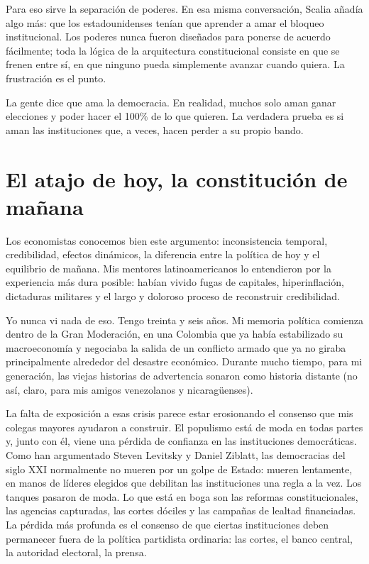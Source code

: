\documentclass[11pt,letterpaper]{article}
\begin{document}
Para eso sirve la separación de poderes. En esa misma conversación, Scalia añadía algo más: que los estadounidenses tenían que aprender a amar el bloqueo institucional. Los poderes nunca fueron diseñados para ponerse de acuerdo fácilmente; toda la lógica de la arquitectura constitucional consiste en que se frenen entre sí, en que ninguno pueda simplemente avanzar cuando quiera. La frustración es el punto.

La gente dice que ama la democracia. En realidad, muchos solo aman ganar elecciones y poder hacer el 100\% de lo que quieren. La verdadera prueba es si aman las instituciones que, a veces, hacen perder a su propio bando.

\section{El atajo de hoy, la constitución de mañana}

Los economistas conocemos bien este argumento: inconsistencia temporal, credibilidad, efectos dinámicos, la diferencia entre la política de hoy y el equilibrio de mañana. Mis mentores latinoamericanos lo entendieron por la experiencia más dura posible: habían vivido fugas de capitales, hiperinflación, dictaduras militares y el largo y doloroso proceso de reconstruir credibilidad.

Yo nunca vi nada de eso. Tengo treinta y seis años. Mi memoria política comienza dentro de la Gran Moderación, en una Colombia que ya había estabilizado su macroeconomía y negociaba la salida de un conflicto armado que ya no giraba principalmente alrededor del desastre económico. Durante mucho tiempo, para mi generación, las viejas historias de advertencia sonaron como historia distante (no así, claro, para mis amigos venezolanos y nicaragüenses).

La falta de exposición a esas crisis parece estar erosionando el consenso que mis colegas mayores ayudaron a construir. El populismo está de moda en todas partes y, junto con él, viene una pérdida de confianza en las instituciones democráticas. Como han argumentado Steven Levitsky y Daniel Ziblatt, las democracias del siglo XXI normalmente no mueren por un golpe de Estado: mueren lentamente, en manos de líderes elegidos que debilitan las instituciones una regla a la vez. Los tanques pasaron de moda. Lo que está en boga son las reformas constitucionales, las agencias capturadas, las cortes dóciles y las campañas de lealtad financiadas. La pérdida más profunda es el consenso de que ciertas instituciones deben permanecer fuera de la política partidista ordinaria: las cortes, el banco central, la autoridad electoral, la prensa.
\end{document}
